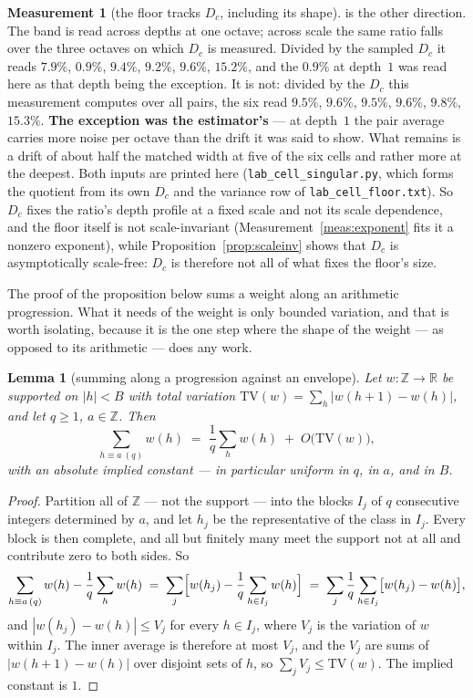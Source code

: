 \documentclass[11pt,a4paper]{article}
\theoremstyle{plain}
\newtheorem{lemma}[theorem]{Lemma}
\theoremstyle{definition}
\newtheorem{measurement}[theorem]{Measurement}
\theoremstyle{remark}
\begin{document}
\begin{measurement}[the floor tracks $D_c$, including its shape]
is the other direction. The band is read across depths at one
octave; across scale the same ratio falls over the three octaves on
which $D_c$ is measured. Divided by the sampled $D_c$ it reads
$7.9\%$, $0.9\%$, $9.4\%$, $9.2\%$, $9.6\%$, $15.2\%$, and the
$0.9\%$ at depth~$1$ was read here as that depth being the exception.
It is not: divided by the $D_c$ this measurement computes over all
pairs, the six read $9.5\%$, $9.6\%$, $9.5\%$, $9.6\%$, $9.8\%$,
$15.3\%$. \textbf{The exception was the estimator's} --- at depth~$1$
the pair average carries more noise per octave than the drift it was
said to show. What remains is a drift of about half the matched width
at five of the six cells and rather more at the deepest. Both inputs are printed here
(\texttt{lab\_cell\_singular.py}, which forms the
quotient from its own $D_c$ and the variance row of
\texttt{lab\_cell\_floor.txt}). So $D_c$ fixes the
ratio's depth profile at a fixed scale and not its scale
dependence, and the floor itself is not scale-invariant
(Measurement~\ref{meas:exponent} fits it a nonzero exponent), while
Proposition~\ref{prop:scaleinv} shows that $D_c$ is asymptotically
scale-free: $D_c$ is therefore not all of what fixes the
floor's size.
\end{measurement}

The proof of the proposition below sums a weight along an arithmetic
progression. What it needs of the weight is only bounded variation, and
that is worth isolating, because it is the one step where the shape of
the weight --- as opposed to its arithmetic --- does any work.

\begin{lemma}[summing along a progression against an envelope]%
\label{lem:envtv}
Let $w:\mathbb Z\to\mathbb R$ be supported on $|h|<B$ with total
variation $\mathrm{TV}(w)=\sum_h|w(h+1)-w(h)|$, and let $q\ge1$,
$a\in\mathbb Z$. Then
\[
  \sum_{h\equiv a\ (q)} w(h)
  \;=\;\frac1q\sum_h w(h)\;+\;O\bigl(\mathrm{TV}(w)\bigr),
\]
with an absolute implied constant --- in particular uniform in $q$, in
$a$, and in $B$.
\end{lemma}

\begin{proof}
Partition all of $\mathbb Z$ --- not the support --- into the blocks
$I_j$ of $q$ consecutive integers determined by $a$, and let $h_j$ be
the representative of the class in $I_j$. Every block is then complete,
and all but finitely many meet the support not at all and contribute
zero to both sides. So
\[
  \sum_{h\equiv a\,(q)}w(h)-\frac1q\sum_h w(h)
  \;=\;\sum_j\Bigl[w(h_j)-\frac1q\sum_{h\in I_j}w(h)\Bigr]
  \;=\;\sum_j\frac1q\sum_{h\in I_j}\bigl[w(h_j)-w(h)\bigr],
\]
and $|w(h_j)-w(h)|\le V_j$ for every $h\in I_j$, where $V_j$ is the
variation of $w$ within $I_j$. The inner average is therefore at most
$V_j$, and the $V_j$ are sums of $|w(h+1)-w(h)|$ over disjoint sets of
$h$, so $\sum_j V_j\le\mathrm{TV}(w)$. The implied constant is $1$.
\end{proof}
\end{document}
